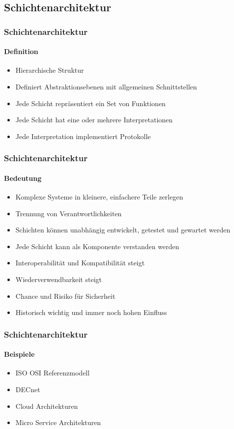 \subsection{Schichtenarchitektur}
\begin{frame}
  \frametitle{Schichtenarchitektur}
  \framesubtitle{Definition}
  \begin{itemize}
    \item Hierarchische Struktur 
    \item Definiert Abstraktionsebenen mit allgemeinen Schnittstellen
    \item Jede Schicht repräsentiert ein Set von Funktionen
    \item Jede Schicht hat eine oder mehrere Interpretationen
    \item Jede Interpretation implementiert Protokolle 
  \end{itemize}
\end{frame}
\begin{frame}
  \frametitle{Schichtenarchitektur}
  \framesubtitle{Bedeutung}
  \begin{itemize}
    \item Komplexe Systeme in kleinere, einfachere Teile zerlegen
    \item Trennung von Verantwortlichkeiten 
    \item Schichten können unabhängig entwickelt, getestet und gewartet werden
    \item Jede Schicht kann als Komponente verstanden werden
    \item Interoperabilität und Kompatibilität steigt
    \item Wiederverwendbarkeit steigt 
    \item Chance und Risiko für Sicherheit
    \item Historisch wichtig und immer noch hohen Einfluss
  \end{itemize}
\end{frame}
\begin{frame}
  \frametitle{Schichtenarchitektur}
  \framesubtitle{Beispiele}
  \begin{itemize}
    \item ISO OSI Referenzmodell
    \item DECnet
    \item Cloud Architekturen
    \item Micro Service Architekturen
  \end{itemize}
\end{frame}


